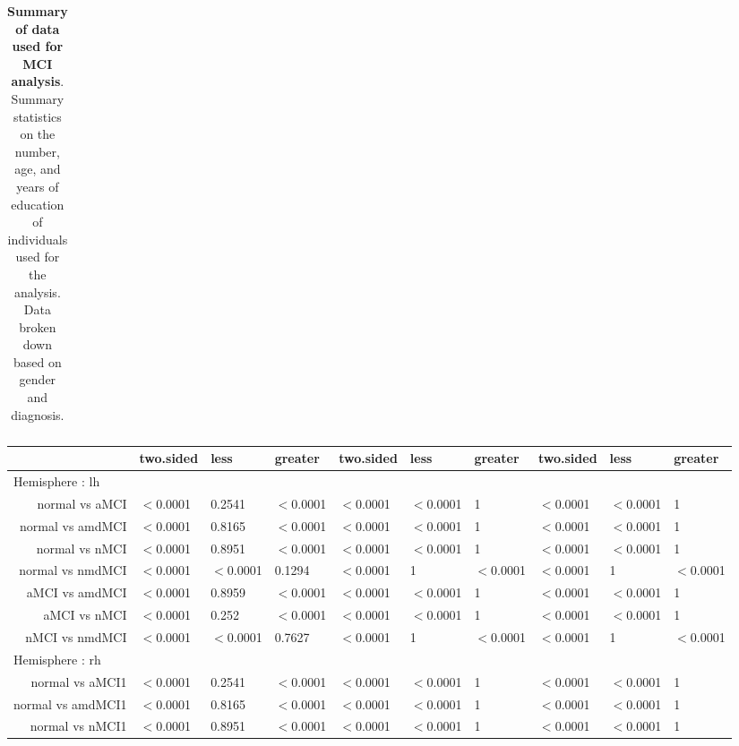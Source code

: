 \documentclass[12pt]{article}\usepackage[]{graphicx}\usepackage[]{color}
\begin{document}
\begin{table}[t]
  \centering
	\begin{tabular}{rrrrrrr}
		\hline

	\end{tabular}
	\caption{\textbf{Summary of data used for MCI analysis}.  Summary statistics on the number, age, and years of education of individuals used for the analysis.  Data broken down based on gender and diagnosis.}
	\label{wave1data}
\end{table}

\begin{table}[ht]
\centering
\begin{tabular}{rlllllllll}
  \hline
 & two.sided & less & greater & two.sided & less & greater & two.sided & less & greater \\ 
  \hline
\multicolumn{9}{l}{Hemisphere : lh}\\
normal vs aMCI & $<$0.0001 & 0.2541 & $<$0.0001 & $<$0.0001 & $<$0.0001 & 1 & $<$0.0001 & $<$0.0001 & 1 \\ 
  normal vs amdMCI & $<$0.0001 & 0.8165 & $<$0.0001 & $<$0.0001 & $<$0.0001 & 1 & $<$0.0001 & $<$0.0001 & 1 \\ 
  normal vs nMCI & $<$0.0001 & 0.8951 & $<$0.0001 & $<$0.0001 & $<$0.0001 & 1 & $<$0.0001 & $<$0.0001 & 1 \\ 
  normal vs nmdMCI & $<$0.0001 & $<$0.0001 & 0.1294 & $<$0.0001 & 1 & $<$0.0001 & $<$0.0001 & 1 & $<$0.0001 \\ 
  aMCI vs amdMCI & $<$0.0001 & 0.8959 & $<$0.0001 & $<$0.0001 & $<$0.0001 & 1 & $<$0.0001 & $<$0.0001 & 1 \\ 
  aMCI vs nMCI & $<$0.0001 & 0.252 & $<$0.0001 & $<$0.0001 & $<$0.0001 & 1 & $<$0.0001 & $<$0.0001 & 1 \\ 
  nMCI vs nmdMCI & $<$0.0001 & $<$0.0001 & 0.7627 & $<$0.0001 & 1 & $<$0.0001 & $<$0.0001 & 1 & $<$0.0001 \\ 
   \hline
\multicolumn{9}{l}{Hemisphere : rh}\\
normal vs aMCI1 & $<$0.0001 & 0.2541 & $<$0.0001 & $<$0.0001 & $<$0.0001 & 1 & $<$0.0001 & $<$0.0001 & 1 \\ 
  normal vs amdMCI1 & $<$0.0001 & 0.8165 & $<$0.0001 & $<$0.0001 & $<$0.0001 & 1 & $<$0.0001 & $<$0.0001 & 1 \\ 
  normal vs nMCI1 & $<$0.0001 & 0.8951 & $<$0.0001 & $<$0.0001 & $<$0.0001 & 1 & $<$0.0001 & $<$0.0001 & 1 \\ 

\end{tabular}
\end{table}
\end{document}
